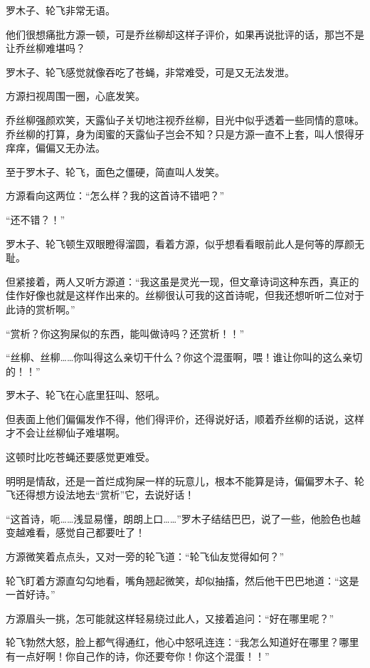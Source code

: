 
\begin{this_body}



罗木子、轮飞非常无语。

他们很想痛批方源一顿，可是乔丝柳却这样子评价，如果再说批评的话，那岂不是让乔丝柳难堪吗？

罗木子、轮飞感觉就像吞吃了苍蝇，非常难受，可是又无法发泄。

方源扫视周围一圈，心底发笑。

乔丝柳强颜欢笑，天露仙子关切地注视乔丝柳，目光中似乎透着一些同情的意味。乔丝柳的打算，身为闺蜜的天露仙子岂会不知？只是方源一直不上套，叫人恨得牙痒痒，偏偏又无办法。

至于罗木子、轮飞，面色之僵硬，简直叫人发笑。

方源看向这两位：“怎么样？我的这首诗不错吧？”

“还不错？！”

罗木子、轮飞顿生双眼瞪得溜圆，看着方源，似乎想看看眼前此人是何等的厚颜无耻。

但紧接着，两人又听方源道：“我这虽是灵光一现，但文章诗词这种东西，真正的佳作好像也就是这样作出来的。丝柳很认可我的这首诗呢，但我还想听听二位对于此诗的赏析啊。”

“赏析？你这狗屎似的东西，能叫做诗吗？还赏析！！”

“丝柳、丝柳……你叫得这么亲切干什么？你这个混蛋啊，喂！谁让你叫的这么亲切的！！”

罗木子、轮飞在心底里狂叫、怒吼。

但表面上他们偏偏发作不得，他们得评价，还得说好话，顺着乔丝柳的话说，这样才不会让丝柳仙子难堪啊。

这顿时比吃苍蝇还要感觉更难受。

明明是情敌，还是一首烂成狗屎一样的玩意儿，根本不能算是诗，偏偏罗木子、轮飞还得想方设法地去“赏析”它，去说好话！

“这首诗，呃……浅显易懂，朗朗上口……”罗木子结结巴巴，说了一些，他脸色也越变越难看，感觉自己都要吐了！

方源微笑着点点头，又对一旁的轮飞道：“轮飞仙友觉得如何？”

轮飞盯着方源直勾勾地看，嘴角翘起微笑，却似抽搐，然后他干巴巴地道：“这是一首好诗。”

方源眉头一挑，怎可能就这样轻易绕过此人，又接着追问：“好在哪里呢？”

轮飞勃然大怒，脸上都气得通红，他心中怒吼连连：“我怎么知道好在哪里？哪里有一点好啊！你自己作的诗，你还要夸你！你这个混蛋！！”


\end{this_body}
